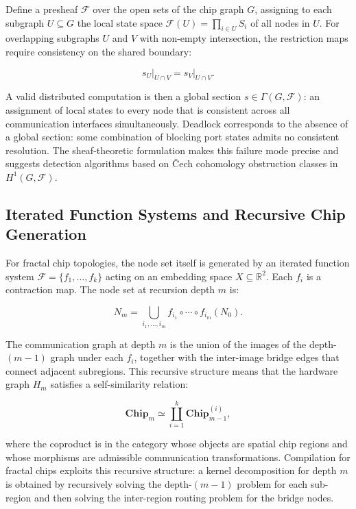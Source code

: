 \documentclass[11pt, a4paper]{article}
\begin{document}
Define a presheaf $\mathscr{F}$ over the open sets of the chip graph $G$,
assigning to each subgraph $U \subseteq G$ the local state space
$\mathscr{F}(U) = \prod_{i \in U} S_i$ of all nodes in $U$. For overlapping
subgraphs $U$ and $V$ with non-empty intersection, the restriction maps require
consistency on the shared boundary:

\[
s_U \big|_{U \cap V} = s_V \big|_{U \cap V}.
\]

A valid distributed computation is then a global section $s \in \Gamma(G, \mathscr{F})$:
an assignment of local states to every node that is consistent across all
communication interfaces simultaneously. Deadlock corresponds to the
absence of a global section: some combination of blocking port states admits
no consistent resolution. The sheaf-theoretic formulation makes this failure mode
precise and suggests detection algorithms based on Čech cohomology obstruction
classes in $H^1(G, \mathscr{F})$.

\subsection{Iterated Function Systems and Recursive Chip Generation}

For fractal chip topologies, the node set itself is generated by an iterated
function system $\mathcal{F} = \{f_1, \ldots, f_k\}$ acting on an embedding
space $X \subseteq \mathbb{R}^2$. Each $f_i$ is a contraction map. The node
set at recursion depth $m$ is:

\[
N_m = \bigcup_{i_1, \ldots, i_m} f_{i_1} \circ \cdots \circ f_{i_m}(N_0).
\]

The communication graph at depth $m$ is the union of the images of the depth-$(m-1)$
graph under each $f_i$, together with the inter-image bridge edges that connect
adjacent subregions. This recursive structure means that the hardware graph $H_m$
satisfies a self-similarity relation:

\[
\mathbf{Chip}_m \simeq \coprod_{i=1}^{k} \mathbf{Chip}_{m-1}^{(i)},
\]

where the coproduct is in the category whose objects are spatial chip regions and
whose morphisms are admissible communication transformations. Compilation for
fractal chips exploits this recursive structure: a kernel decomposition for depth
$m$ is obtained by recursively solving the depth-$(m-1)$ problem for each
sub-region and then solving the inter-region routing problem for the bridge nodes.

\end{document}
